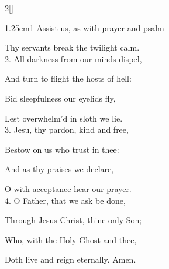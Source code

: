 \begin{paracol}{2}[]

\begin{hangparas}{1.25em}{1}
Assist us, as with prayer and psalm

Thy servants break the twilight calm.\\

2. All darkness from our minds dispel,

And turn to flight the hosts of hell:

Bid sleepfulness our eyelids fly,

Lest overwhelm'd in sloth we lie.\\

3. Jesu, thy pardon, kind and free,

Bestow on us who trust in thee:

And as thy praises we declare,

O with acceptance hear our prayer.\\

4. O Father, that we ask be done,

Through Jesus Christ, thine only Son;

Who, with the Holy Ghost and thee,

Doth live and reign eternally. Amen.
\end{hangparas}

\end{paracol}

\clearpage
{}


